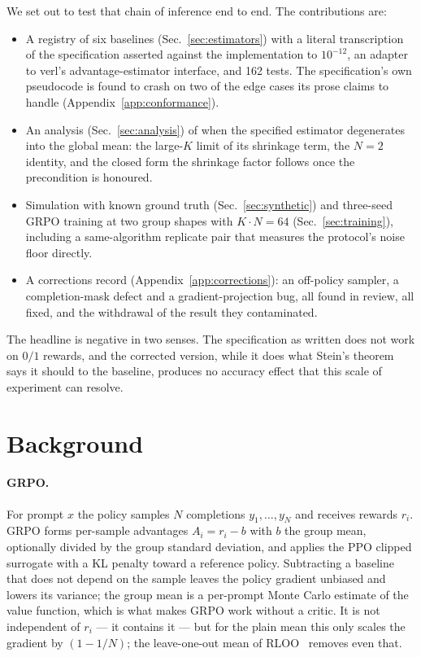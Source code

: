 \documentclass{article}
\begin{document}
We set out to test that chain of inference end to end. The contributions
are:

\begin{itemize}\itemsep2pt
\item A registry of six baselines (Sec.~\ref{sec:estimators}) with a literal
      transcription of the specification asserted against the implementation
      to $10^{-12}$, an adapter to verl's advantage-estimator interface, and
      162 tests. The specification's own pseudocode is found to crash on two
      of the edge cases its prose claims to handle
      (Appendix~\ref{app:conformance}).
\item An analysis (Sec.~\ref{sec:analysis}) of when the specified estimator
      degenerates into the global mean: the large-$K$ limit of its shrinkage
      term, the $N=2$ identity, and the closed form the shrinkage factor
      follows once the precondition is honoured.
\item Simulation with known ground truth (Sec.~\ref{sec:synthetic}) and
      three-seed GRPO training at two group shapes with $K\cdot N=64$
      (Sec.~\ref{sec:training}), including a same-algorithm replicate pair
      that measures the protocol's noise floor directly.
\item A corrections record (Appendix~\ref{app:corrections}): an off-policy
      sampler, a completion-mask defect and a gradient-projection bug, all
      found in review, all fixed, and the withdrawal of the result they
      contaminated.
\end{itemize}

The headline is negative in two senses. The specification as written does
not work on $0/1$ rewards, and the corrected version, while it does what
Stein's theorem says it should to the baseline, produces no accuracy effect
that this scale of experiment can resolve.

\section{Background}

\paragraph{GRPO.} For prompt $x$ the policy samples $N$ completions
$y_1,\dots,y_N$ and receives rewards $r_i$. GRPO forms per-sample
advantages $A_i = r_i - b$ with $b$ the group mean, optionally divided by the
group standard deviation, and applies the PPO clipped surrogate with a KL
penalty toward a reference policy. Subtracting a baseline that does not
depend on the sample leaves the policy gradient unbiased and lowers its
variance; the group mean is a per-prompt Monte Carlo estimate of the value
function, which is what makes GRPO work without a critic. It is not
independent of $r_i$ --- it contains it --- but for the plain mean this only
scales the gradient by $(1-1/N)$; the leave-one-out mean of
RLOO~\citep{ahmadian2024rloo} removes even that.
\end{document}
